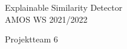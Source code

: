 
\clearmainofpairofpagestyles


\begin{center}
    \vspace*{2cm}
    \Huge{Explainable Similarity Detector}\\

    \vspace*{0.3cm}
    \huge{AMOS WS 2021/2022}

    \vspace*{1.5cm}
    \large{Projektteam 6}

    \vspace*{0.5cm}
    \normalfont{\todayGer}
\end{center}

\vspace*{\fill}

\renewcommand{\contentsname}{Inhaltsverzeichnis}
\tableofcontents

\vspace*{0.5cm}

\renewcommand{\listfigurename}{Abbildungsverzeichnis}
\listoffigures

\vspace*{\fill}
